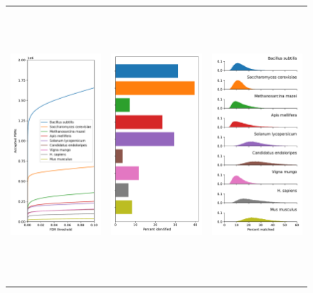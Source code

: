 \documentclass{article}
\begin{document}
\begin{figure}
  \centering
  \begin{tabular}{lll}
    \includegraphics[height=4in]{nine-species-fdrs.pdf} &
    \includegraphics[height=4in]{percent-id.pdf}  &
    \includegraphics[height=4in]{match-by.pdf}  \\

\end{tabular}
\end{figure}
\end{document}
